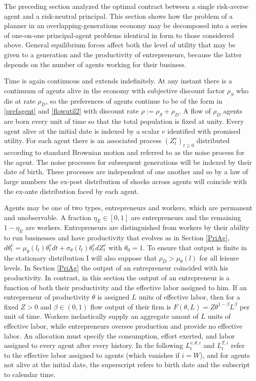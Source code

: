 \documentclass[11pt]{article}
\theoremstyle{plain}
\begin{document}
The preceding section analyzed the optimal contract between a single risk-averse agent and a risk-neutral principal. This section shows how the problem of a planner in an overlapping-generations economy may be decomposed into a series of one-on-one principal-agent problems identical in form to those considered above. General equilibrium forces affect both the level of utility that may be given to a generation and the productivity of entrepreneurs, because the latter depends on the number of agents working for their business. 


Time is again continuous and extends indefinitely. At any instant there is a continuum of agents alive in the economy with subjective discount factor $\rho_S$ who die at rate $\rho_D$, so the preferences of agents continue to be of the form in \eqref{prefagent} and \eqref{flowutil2} with discount rate $\rho := \rho_S+\rho_D$. A flow of $\rho_D$ agents are born every unit of time so that the total population is fixed at unity. Every agent alive at the initial date is indexed by a scalar $v$ identified with promised utility. For each agent there is an associated process $(Z^v_t)_{t\geq0}$ distributed according to standard Brownian motion and referred to as the noise process for the agent. The noise processes for subsequent generations will be indexed by their date of birth. These processes are independent of one another and so by a law of large numbers the ex-post distribution of shocks across agents will coincide with the ex-ante distribution faced by each agent. 


Agents may be one of two types, entrepreneurs and workers, which are permanent and unobservable. A fraction $\eta_E \in [0,1]$ are entrepreneurs and the remaining $1-\eta_E$ are workers. Entrepreneurs are distinguished from workers by their ability to run businesses and have productivity that evolves as in Section \ref{PriAg}, $d\theta^v_t = \mu_{\theta}(l_t)\theta^v_tdt + \sigma_{\theta}(l_t)\theta^v_t dZ^v_t$ with $\theta_0 = 1$. To ensure that output is finite in the stationary distribution I will also suppose that $\rho_D > \mu_{\theta}(l)$ for all leisure levels. In Section \ref{PriAg} the output of an entrepreneur coincided with his productivity. In contrast, in this section the output of an entrepreneur is a function of both their productivity and the effective labor assigned to him. If an entrepreneur of productivity $\theta$ is assigned $L$ units of effective labor, then for a fixed $Z>0$ and $\beta \in (0,1)$ flow output of their firm is $F(\theta,L) = Z\theta^{1-\beta}L^{\beta}$ per unit of time. Workers inelastically supply an aggregate amont of $\overline{L}$ units of effective labor, while entrepreneurs oversee production and provide no effective labor.  An allocation must specify the consumption, effort exerted, and labor assigned to every agent after every history. In the following $L^{v,\theta,i}_t$ and $L^{T,i}_t$ refer to the effective labor assigned to agents (which vanishes if $i=W$), and for agents not alive at the initial date, the superscript refers to birth date and the subscript to calendar time.
\end{document}
